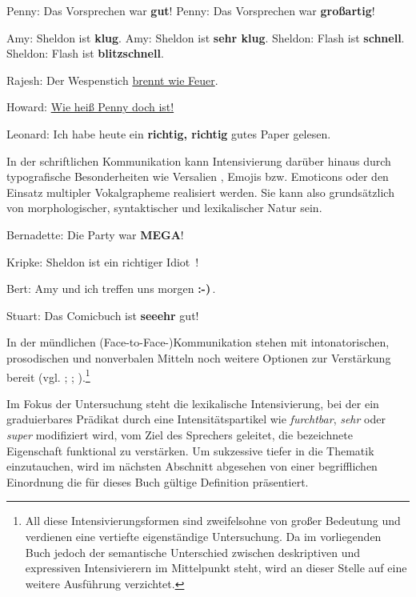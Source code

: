 \ea  \label{Ex1}
\ea Penny: \glqq{}Das Vorsprechen war \textbf{gut}!\grqq{}
\ex Penny: \glqq{}Das Vorsprechen war \textbf{großartig}!\grqq{}
 \z
 \z

\ea  \label{Ex2}
\ea Amy: \glqq{}Sheldon ist \textbf{klug}.\grqq{}
\ex Amy: \glqq{}Sheldon ist \textbf{sehr klug}.\grqq{}
\ex Sheldon: \glqq{}Flash ist \textbf{schnell}.\grqq{}
\ex Sheldon: \glqq{}Flash ist \textbf{blitzschnell}.\grqq{}
 \z
 \z

\ea  Rajesh: \glqq{}Der Wespenstich \uline{brennt wie Feuer}.\grqq{} \label{Ex3}
\z

\ea  Howard: \glqq{}\uline{Wie heiß Penny doch ist!}\grqq{} \label{Ex4}
\z

\ea   Leonard: \glqq{}Ich habe heute ein \textbf{richtig, richtig} gutes Paper gelesen.\grqq{} \label{Ex5}
\z

\noindent In der schriftlichen Kommunikation kann Intensivierung darüber hinaus durch typografische Besonderheiten wie Versalien , Emojis  bzw. Emoticons  oder den Einsatz multipler Vokalgrapheme  realisiert werden. Sie kann also grundsätzlich von morphologischer, syntaktischer und lexikalischer Natur sein.

\ea  Bernadette: \glqq{}Die Party war \textbf{MEGA}!\grqq{} \label{Ex6}
\z

\ea  Kripke: \glqq{}Sheldon ist ein richtiger Idiot \textbf{\Laughey}\,!\grqq{} \label{Ex7}
\z

\ea  Bert: \glqq{}Amy und ich treffen uns morgen \textbf{:-)}\,.\grqq{} \label{Ex8}
\z

\ea  Stuart: \glqq{}Das Comicbuch ist \textbf{seeehr} gut!\grqq{} \label{Ex9}
\z

\noindent In der mündlichen {(Face-to-Face-)}Kommunikation stehen mit intonatorischen, prosodischen und nonverbalen Mitteln noch weitere Optionen zur Verstärkung bereit (vgl. {\citealt[10]{Paradis.1997}}; {\citealt[187]{Liebrecht.2019}}; {\citealt[2]{Scheffler.2023}}).\footnote{All diese Intensivierungsformen sind zweifelsohne von großer Bedeutung und verdienen eine vertiefte eigenständige Untersuchung. Da im vorliegenden Buch jedoch der semantische Unterschied zwischen deskriptiven und expressiven Intensivierern im Mittelpunkt steht, wird an dieser Stelle auf eine weitere Ausführung verzichtet.}

Im Fokus der Untersuchung steht die lexikalische Intensivierung, bei der ein graduierbares Prädikat
durch eine Intensitätspartikel wie \textit{furchtbar}, \textit{sehr} oder \textit{super} modifiziert wird, vom Ziel des Sprechers geleitet, die bezeichnete Eigenschaft funktional zu verstärken. Um sukzessive tiefer in die Thematik einzutauchen, wird im nächsten Abschnitt abgesehen von einer begrifflichen Einordnung die für dieses Buch gültige Definition präsentiert.

